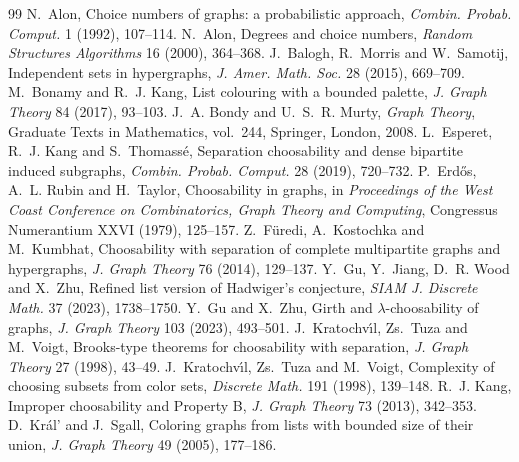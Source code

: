 \documentclass[10pt,a4paper]{amsart}
\numberwithin{equation}{section}
\begin{document}
\begin{thebibliography}{99}
 N.~Alon, \newblock Choice numbers of graphs: a probabilistic approach, \newblock \emph{Combin. Probab. Comput.} 1 (1992), 107--114.
 N.~Alon, \newblock Degrees and choice numbers, \newblock \emph{Random Structures Algorithms} 16 (2000), 364--368.
 J.~Balogh, R.~Morris and W.~Samotij, \newblock Independent sets in hypergraphs, \newblock \emph{J. Amer. Math. Soc.} 28 (2015), 669--709.
 M.~Bonamy and R.~J. Kang, \newblock List colouring with a bounded palette, \newblock \emph{J. Graph Theory} 84 (2017), 93--103.
 J.~A. Bondy and U.~S.~R. Murty, \newblock \emph{Graph Theory}, \newblock Graduate Texts in Mathematics, vol.~244, Springer, London, 2008.
 L.~Esperet, R.~J. Kang and S.~Thomass\'e, \newblock Separation choosability and dense bipartite induced subgraphs, \newblock \emph{Combin. Probab. Comput.} 28 (2019), 720--732.
 P.~Erd\H{o}s, A.~L. Rubin and H.~Taylor, \newblock Choosability in graphs, \newblock in \emph{Proceedings of the West Coast Conference on Combinatorics, Graph Theory and Computing}, Congressus Numerantium XXVI (1979), 125--157.
 Z.~F\"uredi, A.~Kostochka and M.~Kumbhat, \newblock Choosability with separation of complete multipartite graphs and hypergraphs, \newblock \emph{J. Graph Theory} 76 (2014), 129--137.
 Y.~Gu, Y.~Jiang, D.~R. Wood and X.~Zhu, \newblock Refined list version of Hadwiger's conjecture, \newblock \emph{SIAM J. Discrete Math.} 37 (2023), 1738--1750.
 Y.~Gu and X.~Zhu, \newblock Girth and $\lambda$-choosability of graphs, \newblock \emph{J. Graph Theory} 103 (2023), 493--501.
 J.~Kratochv{\'\i}l, Zs.~Tuza and M.~Voigt, \newblock Brooks-type theorems for choosability with separation, \newblock \emph{J. Graph Theory} 27 (1998), 43--49.
 J.~Kratochv{\'\i}l, Zs.~Tuza and M.~Voigt, \newblock Complexity of choosing subsets from color sets, \newblock \emph{Discrete Math.} 191 (1998), 139--148.
 R.~J. Kang, \newblock Improper choosability and Property B, \newblock \emph{J. Graph Theory} 73 (2013), 342--353.
 D.~Kr\'al' and J.~Sgall, \newblock Coloring graphs from lists with bounded size of their union, \newblock \emph{J. Graph Theory} 49 (2005), 177--186.

\end{thebibliography}
\end{document}
